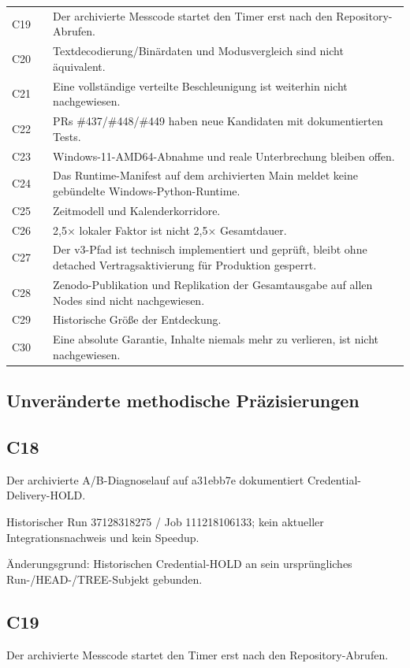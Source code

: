 {\begin{longtable}{@{}L{8mm}L{45mm}L{111mm}@{}}
C19 &  & Der archivierte Messcode startet den Timer erst nach den Repository-Abrufen. \\
C20 &  & Textdecodierung/Binärdaten und Modusvergleich sind nicht äquivalent. \\
C21 &  & Eine vollständige verteilte Beschleunigung ist weiterhin nicht nachgewiesen. \\
C22 &  & PRs \#437/\#448/\#449 haben neue Kandidaten mit dokumentierten Tests. \\
C23 &  & Windows-11-AMD64-Abnahme und reale Unterbrechung bleiben offen. \\
C24 &  & Das Runtime-Manifest auf dem archivierten Main meldet keine gebündelte Windows-Python-Runtime. \\
C25 &  & Zeitmodell und Kalenderkorridore. \\
C26 &  & 2,5× lokaler Faktor ist nicht 2,5× Gesamtdauer. \\
C27 &  & Der v3-Pfad ist technisch implementiert und geprüft, bleibt ohne detached Vertragsaktivierung für Produktion gesperrt. \\
C28 &  & Zenodo-Publikation und Replikation der Gesamtausgabe auf allen Nodes sind nicht nachgewiesen. \\
C29 &  & Historische Größe der Entdeckung. \\
C30 &  & Eine absolute Garantie, Inhalte niemals mehr zu verlieren, ist nicht nachgewiesen. \\
\bottomrule\end{longtable}}
\subsection{Unveränderte methodische Präzisierungen}
\subsection{C18}
Der archivierte A/B-Diagnoselauf auf a31ebb7e dokumentiert Credential-Delivery-HOLD.

Historischer Run 37128318275 / Job 111218106133; kein aktueller Integrationsnachweis und kein Speedup.

Änderungsgrund: Historischen Credential-HOLD an sein ursprüngliches Run-/HEAD-/TREE-Subjekt gebunden.

\subsection{C19}
Der archivierte Messcode startet den Timer erst nach den Repository-Abrufen.

